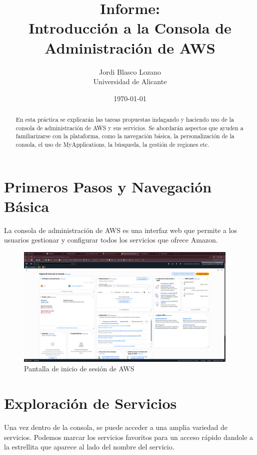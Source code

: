 \documentclass{article}
\title{Informe: \\ Introducción a la Consola de Administración de AWS}
\author{
	Jordi Blasco Lozano \\
	\small Universidad de Alicante
}
\date{\today}
\begin{document}
	
	\maketitle

	\begin{abstract}
	\noindent En esta práctica se explicarán las tareas propuestas indagando y haciendo uso de la consola de administración de AWS y sus servicios. Se abordarán aspectos que ayuden a familiarizarse con la plataforma, como la navegación básica, la personalización de la consola, el uso de MyApplications, la búsqueda, la gestión de regiones etc.
	\end{abstract}

	\tableofcontents

	\newpage

	\section{Primeros Pasos y Navegación Básica}

	La consola de administración de AWS es una interfaz web que permite a los usuarios gestionar y configurar todos los servicios que ofrece Amazon.

	\begin{figure}[h!]
	\centering
	\includegraphics[width=0.95\textwidth]{tarea_1.png}
	\caption{Pantalla de inicio de sesión de AWS}
	\end{figure}

	\section{Exploración de Servicios}

	Una vez dentro de la consola, se puede acceder a una amplia variedad de servicios. Podemos marcar los servicios favoritos para un acceso rápido dandole a la estrellita que aparece al lado del nombre del servicio.
\end{document}
